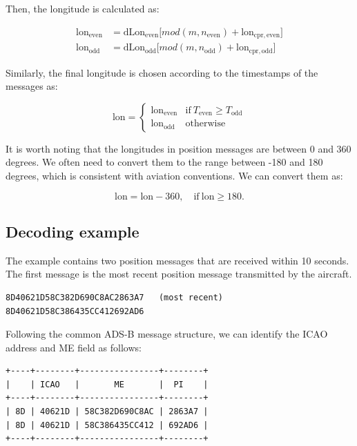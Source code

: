 Then, the longitude is calculated as:

\begin{equation}
\begin{split}
  \mathrm{lon}_\mathrm{even} &= \mathrm{dLon}_\mathrm{even} \Big[ mod(m, n_\mathrm{even}) + \mathrm{lon}_\mathrm{cpr,even} \Big] \\
  \mathrm{lon}_\mathrm{odd} &= \mathrm{dLon}_\mathrm{odd} \Big[ mod(m, n_\mathrm{odd}) + \mathrm{lon}_\mathrm{cpr,odd} \Big]
  \end{split}
\end{equation}


Similarly, the final longitude is chosen according to the timestamps of the messages as:

\begin{equation}
  \mathrm{lon} =
  \begin{cases}
   \mathrm{lon}_\mathrm{even}     & \text{if}~T_\mathrm{even} \ge T_\mathrm{odd} \\
   \mathrm{lon}_\mathrm{odd}     & \text{otherwise}
  \end{cases}
\end{equation}


It is worth noting that the longitudes in position messages are between 0 and 360 degrees. We often need to convert them to the range between -180 and 180 degrees, which is consistent with aviation conventions. We can convert them as:

\begin{equation}
  \mathrm{lon} = \mathrm{lon} - 360,  \quad \text{if}~\mathrm{lon} \ge 180.
\end{equation}

\subsection{Decoding example}

The example contains two position messages that are received within 10 seconds. The first message is the most recent position message transmitted by the aircraft.

\begin{verbatim}
8D40621D58C382D690C8AC2863A7   (most recent)
8D40621D58C386435CC412692AD6
\end{verbatim}

Following the common ADS-B message structure, we can identify the ICAO address and ME field as follows:

\begin{verbatim}
+----+--------+----------------+--------+
|    | ICAO   |       ME       |  PI    |
+----+--------+----------------+--------+
| 8D | 40621D | 58C382D690C8AC | 2863A7 |
| 8D | 40621D | 58C386435CC412 | 692AD6 |
+----+--------+----------------+--------+
\end{verbatim}

